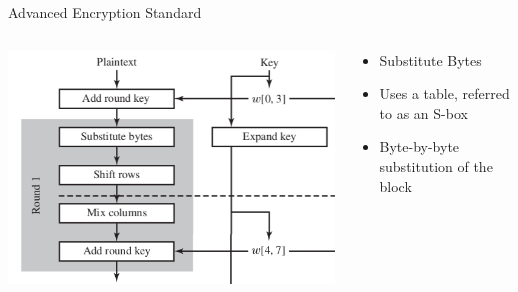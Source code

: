 \documentclass{beamer}
\begin{document}
\begin{frame}{Advanced Encryption Standard}
\begin{columns}[onlytextwidth]
    \begin{column}{0.6\textwidth}
  \begin{center}
    \includegraphics[width=1\linewidth]{AES-round}
  \end{center}
    \end{column}
    \begin{column}{0.4\textwidth}
  \begin{itemize}
  \item Substitute Bytes
  \item Uses a table, referred to as an S-box
  \item Byte-by-byte substitution of the block
  \end{itemize}
    \end{column}
    \end{columns}
\end{frame}
\end{document}

